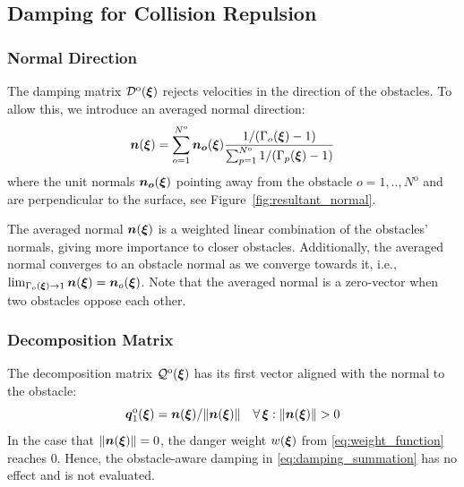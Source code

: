 \subsection{Damping for Collision Repulsion} \label{sec:obstacle_repulsion}

\subsubsection{Normal Direction}
The damping matrix $\mathcal{D}^{\mathrm{o}}(\boldsymbol{\xi})$ rejects velocities in the direction of the obstacles. To allow this, we introduce an averaged normal direction:
\begin{equation}
  \vecs n(\vecs\xi) = \sum_{o=1}^{N^{\mathrm{o}}} \vecs{n_o}(\vecs\xi)
  \frac{1 / (\Gamma_o(\vecs \xi) - 1)}{\sum_{p=1}^{N^\mathrm{o}} 1 / (\Gamma_p(\vecs \xi) - 1)}
  \label{eq:averaged_normal}
\end{equation}
 where the unit normals $\boldsymbol{n_o} (\boldsymbol{\xi})$ pointing away from the obstacle $o = 1,  ..,  N^{\mathrm{o}}$ and are perpendicular to the surface, see Figure~\ref{fig:resultant_normal}. 

The averaged normal $\boldsymbol{n}(\boldsymbol{\xi})$ is a weighted linear combination of the obstacles' normals, giving more importance to closer obstacles.
Additionally, the averaged normal converges to an obstacle normal as we converge towards it, i.e., $\lim_{\Gamma_o(\boldsymbol{\xi}) \rightarrow 1} \boldsymbol{n}(\boldsymbol{\xi}) = \boldsymbol{n}_o(\boldsymbol{\xi})$.
Note that the averaged normal is a zero-vector when two obstacles oppose each other. 

\subsubsection{Decomposition Matrix}
The decomposition matrix $\mathcal{Q}^{\mathrm{o}}(\boldsymbol{\xi})$ has its first vector aligned with the normal to the obstacle:  
\begin{equation}
    \vecs q_1^{\mathrm{o}}(\vecs\xi) =  \vecs n(\vecs\xi) / \lVert\vecs n(\vecs\xi)\rVert 
    \quad \forall \, \vecs \xi : \lVert\vecs n(\vecs\xi)\rVert  > 0
    \label{eq:first_obstacle_basis}
\end{equation}
In the case that $\lVert\boldsymbol{n}(\boldsymbol{\xi})\rVert = 0$, the danger weight $w(\boldsymbol{\xi})$ from \eqref{eq:weight_function} reaches 0. Hence, the obstacle-aware damping in \eqref{eq:damping_summation} has no effect and is not evaluated.

